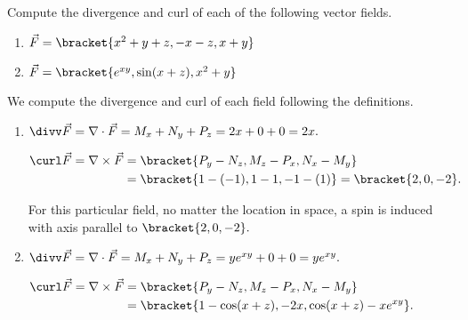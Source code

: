 \begin{example}\label{ex_vectorfield2}
Compute the divergence and curl of each of the following vector fields.
\begin{enumerate}
	\item $\vec F =\bracket{x^2+y+z, -x-z, x+y}$
	\item	$\vec F =\bracket{e^{xy}, \sin(x+z),x^2+y}$
\end{enumerate}
\solution
We compute the divergence and curl of each field following the definitions.
\begin{enumerate}
	\item $\divv \vec F = \nabla \cdot \vec F = M_x+N_y+P_z = 2x+0+0= 2x.$
	
	$\begin{aligned}\curl\vec F = \nabla \times \vec F &=\bracket{P_y-N_z,M_z-P_x,N_x - M_y}\\ &=\bracket{1 - (-1), 1-1,-1-(1)}=\bracket{2,0,-2}.
	\end{aligned}$
	
	For this particular field, no matter the location in space, a spin is induced with axis parallel to $\bracket{2,0,-2}.$
	\item $\divv \vec F = \nabla \cdot \vec F = M_x+N_y+P_z = ye^{xy}+0+0= ye^{xy}.$
		
	$\begin{aligned}\curl\vec F = \nabla \times \vec F &=\bracket{P_y-N_z,M_z-P_x,N_x - M_y}\\ &=\bracket{1-\cos(x+z), -2x, \cos(x+z) - xe^{xy}}.\end{aligned}$
\end{enumerate}
\end{example}

